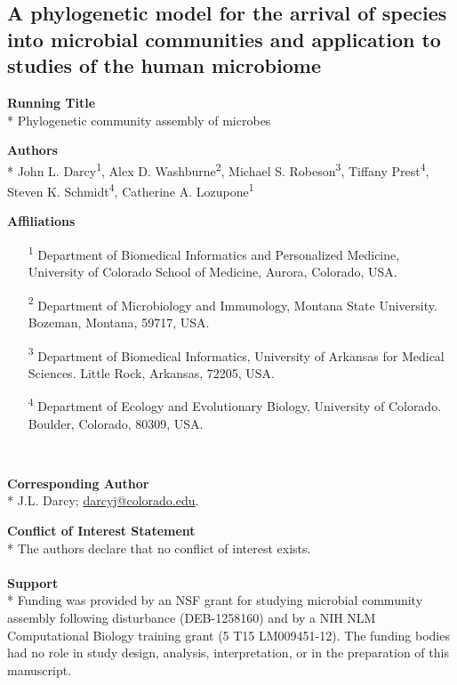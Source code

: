 \documentclass{article}
\begin{document}
{\parindent0pt %
\begin{adjustwidth}{1cm}{1cm} \begin{center}
\section{A phylogenetic model for the arrival of species into microbial communities and application to studies of the human microbiome}
\end{center}  \end{adjustwidth}

\par
\textbf{Running Title}\\*
Phylogenetic community assembly of microbes
\\\par
\textbf{Authors}\\*
John L. Darcy\textsuperscript{1},
Alex D. Washburne\textsuperscript{2},
Michael S. Robeson\textsuperscript{3},
Tiffany Prest\textsuperscript{4},
Steven K. Schmidt\textsuperscript{4},
Catherine A. Lozupone\textsuperscript{1}
\\\par
\textbf{Affiliations}
\begin{enumerate}[topsep=0pt,itemsep=-1ex,partopsep=1ex,parsep=1ex, leftmargin=*,align=left]
	\item[\textsuperscript{1}] Department of Biomedical Informatics and Personalized Medicine, University of Colorado School of Medicine, Aurora, Colorado, USA.
	\item[\textsuperscript{2}] Department of Microbiology and Immunology, Montana State University. Bozeman, Montana, 59717, USA.
	\item[\textsuperscript{3}] Department of Biomedical Informatics, University of Arkansas for Medical Sciences. Little Rock, Arkansas, 72205, USA.
	\item[\textsuperscript{4}] Department of Ecology and Evolutionary Biology, University of Colorado. Boulder, Colorado, 80309, USA.
\end{enumerate}
\ \par
\textbf{Corresponding Author}\\*
J.L. Darcy; \href{mailto:darcyj@colorado.edu}{darcyj@colorado.edu}.
\\\par
\textbf{Conflict of Interest Statement}\\*
The authors declare that no conflict of interest exists.\\
\\
\textbf{Support}\\*
Funding was provided by an NSF grant for studying microbial community assembly following disturbance (DEB-1258160) and by a NIH NLM Computational Biology training grant (5 T15 LM009451-12). The funding bodies had no role in study design, analysis, interpretation, or in the preparation of this manuscript.\\

} %
\end{document}
